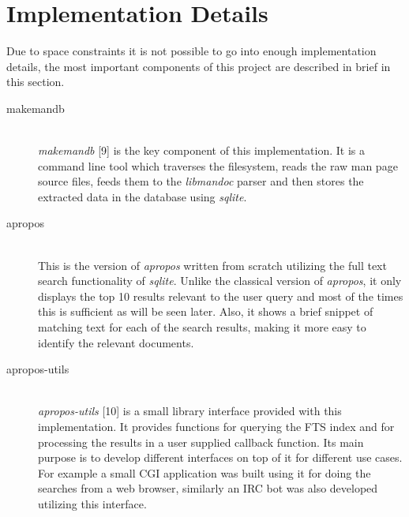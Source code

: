 \documentclass[titlepage, a4paper, 12pt]{article}
\begin{document}
\section{Implementation Details}
Due to space constraints it is not possible to go into enough implementation
details, the most important components of this project are described in brief
in this section.
\begin{description}
\item[makemandb] \hfill \\
\textit{makemandb} [9] is the key component of this implementation. It is a
command line tool which
traverses the filesystem, reads the raw man page source files, feeds them to the
\textit{libmandoc} parser and then stores the extracted data in the database
using \textit{sqlite}.
\end{description}
\begin{description}
\item[apropos] \hfill \\
This is the version of \textit{apropos} written from scratch utilizing the
full text search functionality of \textit{sqlite}. Unlike the classical version
of \textit{apropos}, it only displays the top 10 results relevant to the user
query and most of the times this is sufficient as will be seen later. Also, it
shows a brief snippet of matching text for each of the search results, making it
more easy to identify the relevant documents.
\end{description}
\begin{description}
\item[apropos-utils] \hfill \\
\textit{apropos-utils} [10] is a small library interface provided with this
implementation. It provides functions for querying the FTS index and for
processing the results in a user supplied callback function. Its main purpose
is to develop different interfaces on top of it for different
use cases. For example a small CGI application was built using it for doing
the searches from a web browser, similarly an IRC bot was also developed utilizing this interface.
\end{description}
\end{document}
